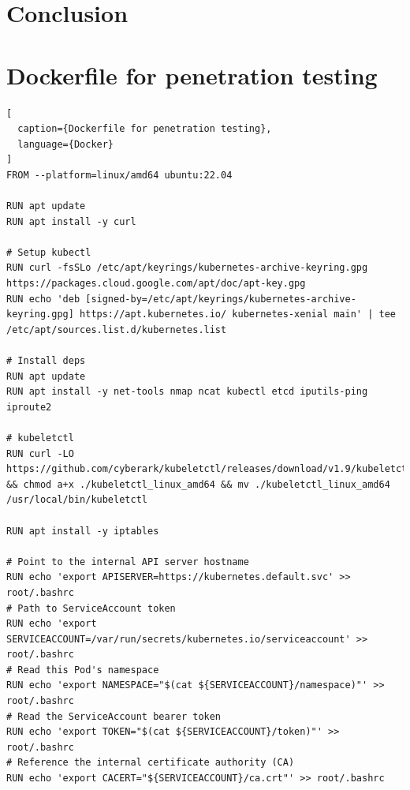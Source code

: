 \documentclass[english, 12pt, a4paper, sci, utf8, a-2b, online]{aaltothesis}
\begin{document}
\clearpage

\section{Conclusion} \label{sec:conclusion}

\clearpage

\thesisbibliography
\printbibliography

\clearpage

\thesisappendix

\section{Dockerfile for penetration testing} \label{app:malicious-sidecar}

\begin{lstlisting}[
  caption={Dockerfile for penetration testing},
  language={Docker}
]
FROM --platform=linux/amd64 ubuntu:22.04

RUN apt update
RUN apt install -y curl

# Setup kubectl
RUN curl -fsSLo /etc/apt/keyrings/kubernetes-archive-keyring.gpg https://packages.cloud.google.com/apt/doc/apt-key.gpg
RUN echo 'deb [signed-by=/etc/apt/keyrings/kubernetes-archive-keyring.gpg] https://apt.kubernetes.io/ kubernetes-xenial main' | tee /etc/apt/sources.list.d/kubernetes.list

# Install deps
RUN apt update
RUN apt install -y net-tools nmap ncat kubectl etcd iputils-ping iproute2

# kubeletctl
RUN curl -LO https://github.com/cyberark/kubeletctl/releases/download/v1.9/kubeletctl_linux_amd64 && chmod a+x ./kubeletctl_linux_amd64 && mv ./kubeletctl_linux_amd64 /usr/local/bin/kubeletctl

RUN apt install -y iptables

# Point to the internal API server hostname
RUN echo 'export APISERVER=https://kubernetes.default.svc' >> root/.bashrc
# Path to ServiceAccount token
RUN echo 'export SERVICEACCOUNT=/var/run/secrets/kubernetes.io/serviceaccount' >> root/.bashrc
# Read this Pod's namespace
RUN echo 'export NAMESPACE="$(cat ${SERVICEACCOUNT}/namespace)"' >> root/.bashrc
# Read the ServiceAccount bearer token
RUN echo 'export TOKEN="$(cat ${SERVICEACCOUNT}/token)"' >> root/.bashrc
# Reference the internal certificate authority (CA)
RUN echo 'export CACERT="${SERVICEACCOUNT}/ca.crt"' >> root/.bashrc
\end{lstlisting}
\end{document}
